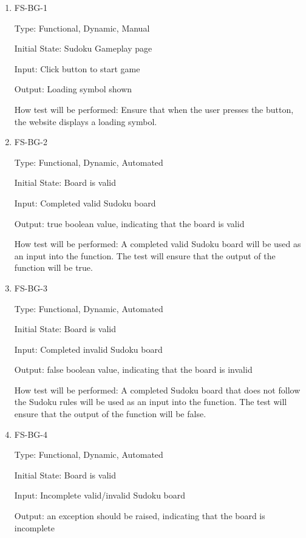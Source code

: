 \documentclass[11pt]{article}
\begin{document}
\begin{enumerate}

\item{FS-BG-1\\}

Type: Functional, Dynamic, Manual
					
Initial State: Sudoku Gameplay page
					
Input: Click button to start game
					
Output: Loading symbol shown
					
How test will be performed: Ensure that when the user presses the button, the website displays a loading symbol.
					
\item{FS-BG-2\\}

Type: Functional, Dynamic, Automated
					
Initial State: Board is valid
					
Input: Completed valid Sudoku board
					
Output: true boolean value, indicating that the board is valid
					
How test will be performed: A completed valid Sudoku board will be used as an input into the function. The test will ensure that the output of the function will be true.

\item{FS-BG-3\\}

Type: Functional, Dynamic, Automated
					
Initial State: Board is valid
					
Input: Completed invalid Sudoku board
					
Output: false boolean value, indicating that the board is invalid
					
How test will be performed: A completed Sudoku board that does not follow the Sudoku rules will be used as an input into the function. The test will ensure that the output of the function will be false.

\item{FS-BG-4\\}

Type: Functional, Dynamic, Automated
					
Initial State: Board is valid
					
Input: Incomplete valid/invalid Sudoku board
					
Output: an exception should be raised, indicating that the board is incomplete
					

\end{enumerate}
\end{document}
